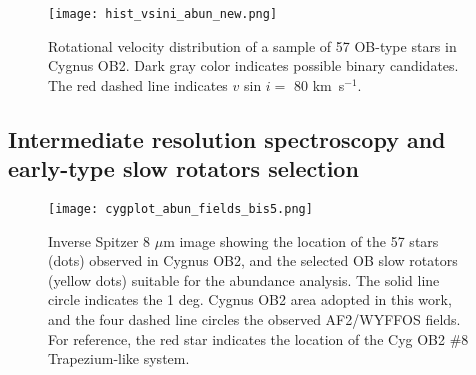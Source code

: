 \documentclass{aa} %
\begin{document}
 \begin{figure}[t!]
\centering
\texttt{[image: hist\_vsini\_abun\_new.png]}
\caption{ Rotational velocity distribution of a sample of 57 OB-type stars in Cygnus OB2. Dark gray color indicates possible binary candidates. The red dashed line indicates $v$ sin $i =$ 80 km~s$^{-1}$.}
\label{fig2}
\end{figure}







\subsection{Intermediate resolution spectroscopy and early-type slow rotators selection}\label{sect21}


\begin{figure*}[t!]
\centering
\texttt{[image: cygplot\_abun\_fields\_bis5.png]}
\caption{ Inverse Spitzer 8 $\mu$m image showing the location of the 57 stars (dots) observed in Cygnus OB2, and the selected OB slow rotators (yellow dots) suitable for the abundance analysis. The solid line circle indicates the 1 deg. Cygnus OB2 area adopted in this work, and the four dashed line circles the observed AF2/WYFFOS fields. For reference, the red star indicates the location of the Cyg OB2 $\#8$ Trapezium-like system. }
\label{fig3}
\end{figure*}
\end{document}
